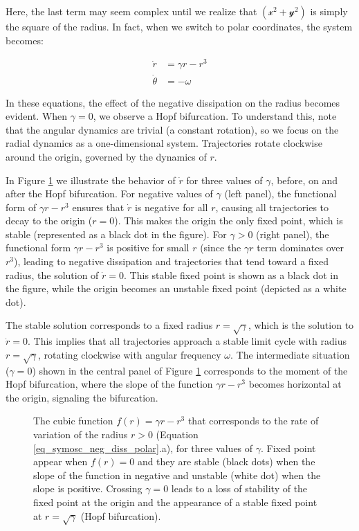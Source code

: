 \documentclass{article}
\begin{document}
Here, the last term may seem complex until we realize that $(\mathscr{x}^2 + \mathscr{y}^2)$ is simply the square of the radius. In fact, when we switch to polar coordinates, the system becomes:

\begin{subequations} \label{eq_symosc_neg_diss_polar}
\begin{align}
    \dot{r} & = \gamma r - r^3 \\
    \dot{\theta} & = -\omega
\end{align}
\end{subequations}

In these equations, the effect of the negative dissipation on the radius becomes evident. When $\gamma = 0$, we observe a Hopf bifurcation. To understand this, note that the angular dynamics are trivial (a constant rotation), so we focus on the radial dynamics as a one-dimensional system. Trajectories rotate clockwise around the origin, governed by the dynamics of $r$.

In Figure \ref{fig_cubic} we illustrate the behavior of $\dot{r}$ for three values of $\gamma$, before, on and after the Hopf bifurcation.
For negative values of $\gamma$ (left panel), the functional form of $\gamma r - r^3$ ensures that $\dot{r}$ is negative for all $r$, causing all trajectories to decay to the origin ($r = 0$). 
This makes the origin the only fixed point, which is stable (represented as a black dot in the figure). 
For $\gamma > 0$ (right panel), the functional form $\gamma r - r^3$ is positive for small $r$ (since the $\gamma r$ term dominates over $r^3$), leading to negative dissipation and trajectories that tend toward a fixed radius, the solution of $\dot{r} = 0$. 
This stable fixed point is shown as a black dot in the figure, while the origin becomes an unstable fixed point (depicted as a white dot).

The stable solution corresponds to a fixed radius $r = \sqrt{\gamma}$, which is the solution to $\dot{r} = 0$. This implies that all trajectories approach a stable limit cycle with radius $r = \sqrt{\gamma}$, rotating clockwise with angular frequency $\omega$. The intermediate situation ($\gamma = 0$) shown in the central panel of Figure \ref{fig_cubic} corresponds to the moment of the Hopf bifurcation, where the slope of the function $\gamma r - r^3$ becomes horizontal at the origin, signaling the bifurcation.

\begin{figure} [h]
    \centerline{}
    \caption{The cubic function $f(r)=\gamma r - r^3$ that corresponds to the rate of variation of the radius $r>0$ (Equation \ref{eq_symosc_neg_diss_polar}.a), for three values of $\gamma$. Fixed point appear when $f(r)=0$ and they are stable (black dots) when the slope of the function in negative and unstable (white dot) when the slope is positive. Crossing $\gamma=0$ leads to a loss of stability of the fixed point at the origin and the appearance of a stable fixed point at $r=\sqrt{\gamma}$ (Hopf bifurcation). } 
    \label{fig_cubic}
\end{figure}
\end{document}
